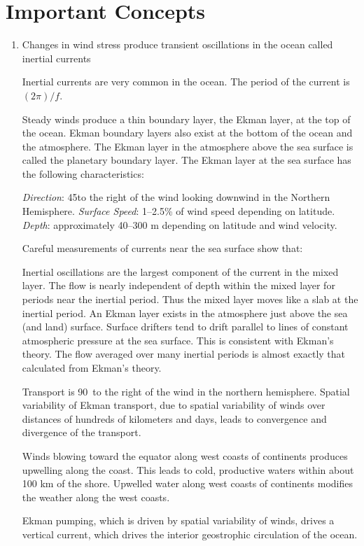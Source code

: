 \section{Important Concepts}
\begin{enumerate}
\item Changes in wind stress produce transient
oscillations in the ocean called inertial currents
\begin{enumerate}
\vitem Inertial currents are very common in the ocean.
\vitem The period of the current is $(2 \pi)/f$.
\end{enumerate}
\vitem Steady winds produce a thin boundary layer, the Ekman layer, at the top of the
ocean. Ekman boundary layers also exist at the bottom of the ocean and the atmosphere.
The Ekman layer in the atmosphere above the sea surface is called the planetary
boundary layer. \vitem The Ekman layer at the sea
surface has the following characteristics:
\begin{enumerate}
\vitem \textit{Direction}: 45\degrees to the right of the wind looking downwind
in the Northern Hemisphere.
\vitem \textit{Surface Speed}: 1--2.5\% of wind speed depending on latitude.
\vitem \textit{Depth}: approximately 40--300 m depending on latitude and wind
velocity.
\end{enumerate}
\vitem Careful measurements of currents near the sea surface show that:
\begin{enumerate}
\vitem Inertial oscillations are the largest component of the current in the mixed
layer.
\vitem The flow is nearly independent of depth within the mixed layer for periods near the inertial period. Thus the
mixed layer moves like a slab at the inertial period.
\vitem An Ekman layer exists in the atmosphere just above the sea  (and land)
surface.
\vitem Surface drifters tend to drift parallel to lines of constant atmospheric
pressure at the sea surface. This is consistent with Ekman's theory.
\vitem The flow averaged over many inertial periods is almost exactly that
calculated from Ekman's theory.
\end{enumerate}
\vitem Transport is 90\degrees\  to the right of the wind in the northern
hemisphere.
\vitem Spatial variability of Ekman transport, due to spatial variability of winds
over distances of hundreds of kilometers and days, leads to convergence and
divergence of the transport.
\begin{enumerate}
\vitem Winds blowing toward the equator along west coasts of continents produces
upwelling along the coast. This leads to cold, productive waters
within about 100 km of the shore.
\vitem Upwelled water along west coasts of continents modifies the weather along
the west coasts.
\end{enumerate}
\vitem Ekman pumping, which is driven by spatial variability of winds, drives a
vertical current, which drives the interior geostrophic
circulation of the ocean.
\end{enumerate}


